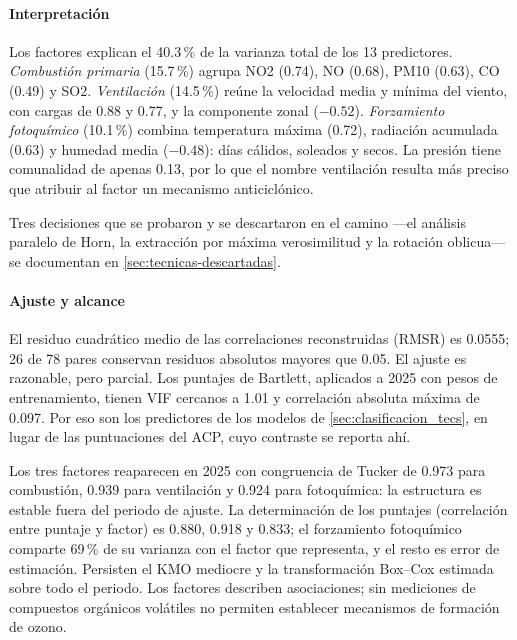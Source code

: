 \paragraph{Interpretación}
Los factores explican el 40.3\,\% de la varianza total de los 13
predictores. \emph{Combustión primaria} (15.7\,\%) agrupa NO2 (0.74), NO
(0.68), PM10 (0.63), CO (0.49) y SO2. \emph{Ventilación} (14.5\,\%) reúne
la velocidad media y mínima del viento, con cargas de 0.88 y 0.77, y la
componente zonal ($-0.52$). \emph{Forzamiento fotoquímico} (10.1\,\%)
combina temperatura máxima (0.72), radiación acumulada (0.63) y humedad
media ($-0.48$): días
cálidos, soleados y secos. La presión tiene comunalidad de apenas
0.13, por lo que el nombre ventilación resulta más preciso que
atribuir al factor un mecanismo anticiclónico.

Tres decisiones que se probaron y se descartaron en el camino ---el análisis paralelo de Horn, la extracción por máxima verosimilitud y la rotación oblicua--- se documentan en \cref{sec:tecnicas-descartadas}.

\paragraph{Ajuste y alcance}
El residuo cuadrático medio de las correlaciones reconstruidas
(RMSR) es 0.0555; 26 de 78 pares conservan residuos absolutos mayores
que 0.05. El ajuste es razonable, pero parcial. Los puntajes de
Bartlett, aplicados a 2025 con pesos de entrenamiento, tienen VIF
cercanos a 1.01 y correlación absoluta máxima de 0.097. Por eso son
los predictores de los modelos de \cref{sec:clasificacion_tecs}, en lugar
de las puntuaciones del ACP, cuyo contraste se reporta ahí.

Los tres factores reaparecen en 2025 con congruencia de Tucker de
0.973 para combustión, 0.939 para ventilación y 0.924 para fotoquímica:
la estructura es estable fuera del periodo de ajuste. La determinación de
los puntajes (correlación entre puntaje y factor) es 0.880, 0.918 y 0.833;
el forzamiento fotoquímico comparte 69\,\% de su varianza con el factor
que representa, y el resto es error de estimación. Persisten el KMO
mediocre y la transformación Box--Cox estimada sobre todo el periodo. Los factores describen asociaciones; sin mediciones de
compuestos orgánicos volátiles no permiten establecer mecanismos
de formación de ozono.
